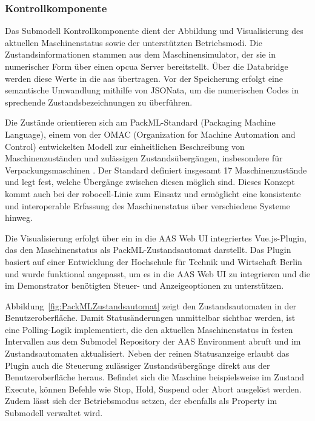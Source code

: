 \subsubsection*{Kontrollkomponente}
\vspace{-0.5em}
Das Submodell Kontrollkomponente dient der Abbildung und Visualisierung des aktuellen Maschinenstatus sowie der unterstützten Betriebsmodi.
Die Zustandsinformationen stammen aus dem Maschinensimulator, der sie in numerischer Form über einen \acs{opcua} Server bereitstellt.
Über die Databridge werden diese Werte in die \acs{aas} übertragen.
Vor der Speicherung erfolgt eine semantische Umwandlung mithilfe von JSONata, um die numerischen Codes in sprechende Zustandsbezeichnungen zu überführen.

Die Zustände orientieren sich am PackML-Standard (Packaging Machine Language), einem von der OMAC (Organization for Machine Automation and Control) entwickelten Modell zur einheitlichen Beschreibung von Maschinenzuständen und zulässigen Zustandsübergängen, insbesondere für Verpackungsmaschinen \cite{OMAC}. 
Der Standard definiert insgesamt 17 Maschinenzustände und legt fest, welche Übergänge zwischen diesen möglich sind. 
Dieses Konzept kommt auch bei der robocell-Linie zum Einsatz und ermöglicht eine konsistente und interoperable Erfassung des Maschinenstatus über verschiedene Systeme hinweg.

Die Visualisierung erfolgt über ein in die AAS Web UI integriertes Vue.js-Plugin, das den Maschinenstatus als PackML-Zustandsautomat darstellt.
Das Plugin basiert auf einer Entwicklung der Hochschule für Technik und Wirtschaft Berlin \cite{HTW1, HTW2} und wurde funktional angepasst, um es in die AAS Web UI zu integrieren und die im Demonstrator benötigten Steuer- und Anzeigeoptionen zu unterstützen.

Abbildung~\ref{fig:PackMLZustandsautomat} zeigt den Zustandsautomaten in der Benutzeroberfläche.
Damit Statusänderungen unmittelbar sichtbar werden, ist eine Polling-Logik implementiert, die den aktuellen Maschinenstatus in festen Intervallen aus dem Submodel Repository der AAS Environment abruft und im Zustandsautomaten aktualisiert.
Neben der reinen Statusanzeige erlaubt das Plugin auch die Steuerung zulässiger Zustandsübergänge direkt aus der Benutzeroberfläche heraus.
Befindet sich die Maschine beispielsweise im Zustand Execute, können Befehle wie Stop, Hold, Suspend oder Abort ausgelöst werden.
Zudem lässt sich der Betriebsmodus setzen, der ebenfalls als Property im Submodell verwaltet wird.

